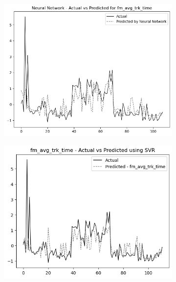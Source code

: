 \begin{figure}
    \centering
    \begin{subfigure}[b]{0.49\textwidth}
        \centering
        \includegraphics[width=\linewidth]{images/nnCharts/all_data_fine_motor_avg_tracking_time.png}
    \end{subfigure}\hfill
    \begin{subfigure}[b]{0.49\textwidth}
        \centering
        \includegraphics[width=\linewidth]{images/regressionCharts/all_data_fine_motor_tracking_time.png}
    \end{subfigure}
    

\end{figure}
